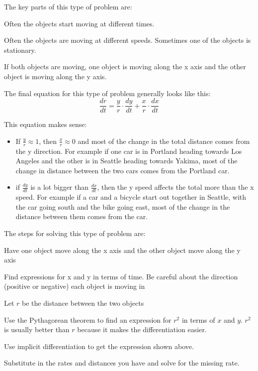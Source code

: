 \documentclass[fleqn]{article}
\begin{document}
The key parts of this type of problem are:
\begin{itemize*}
\item Often the objects start moving at different times.
\item Often the objects are moving at different speeds.  Sometimes one of the objects is stationary.
\item If both objects are moving, one object is moving along the x axis and the other object is moving along the y axis.
\end{itemize*}

The final equation for this type of problem generally looks like this:
\[
  \frac{dr}{dt} = \frac{y}{r} \cdot \frac{dy}{dt} + \frac{x}{r} \cdot \frac{dx}{dt}
\]

This equation makes sense:
\begin{itemize}
  \item If $\frac{y}{r} \approx 1$, then $\frac{x}{r} \approx 0$ and most of the change in the total distance comes from
    the y direction.  For example if one car is in Portland heading towards Los Angeles and the other is in Seattle
    heading towards Yakima, most of the change in distance between the two cars comes from the Portland car.

  \item if $\frac{dy}{dt}$ is a lot bigger than $\frac{dx}{dt}$, then the y speed affects the total more than the x
    speed.  For example if a car and a bicycle start out together in Seattle, with the car going south and the bike
    going east, most of the change in the distance between them comes from the car.
 
\end{itemize}

The steps for solving this type of problem are:
\begin{itemize*}
  \item Have one object move along the x axis and the other object move along the y axis
  \item Find expressions for x and y in terms of time.  Be careful about the direction (positive or negative) each
    object is moving in
  \item Let $r$ be the distance between the two objects
  \item Use the Pythagorean theorem to find an expression for $r^2$ in terms of $x$ and $y$.  $r^2$ is usually better
    than $r$ because it makes the differentiation easier.
  \item Use implicit differentiation to get the expression shown above.
  \item Substitute in the rates and distances you have and solve for the missing rate.
\end{itemize*}
\end{document}
